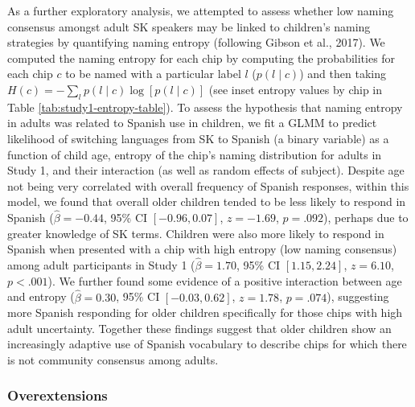 \documentclass[
  english,
  ,apa7,floatsintext]{apa6}
\begin{document}
As a further exploratory analysis, we attempted to assess whether low naming consensus amongst adult SK speakers may be linked to children's naming strategies by quantifying naming entropy (following Gibson et al., 2017). We computed the naming entropy for each chip by computing the probabilities for each chip \(c\) to be named with a particular label \(l\) (\(p(l \mid c)\)) and then taking \(H(c) = -\sum_{l}{p(l\mid c) \log[p(l \mid c)]}\) (see inset entropy values by chip in Table \ref{tab:study1-entropy-table}).
To assess the hypothesis that naming entropy in adults was related to Spanish use in children, we fit a GLMM to predict likelihood of switching languages from SK to Spanish (a binary variable) as a function of child age, entropy of the chip's naming distribution for adults in Study 1, and their interaction (as well as random effects of subject). Despite age not being very correlated with overall frequency of Spanish responses, within this model, we found that overall older children tended to be less likely to respond in Spanish (\(\hat{\beta} = -0.44\), 95\% CI \([-0.96, 0.07]\), \(z = -1.69\), \(p = .092\)), perhaps due to greater knowledge of SK terms. Children were also more likely to respond in Spanish when presented with a chip with high entropy (low naming consensus) among adult participants in Study 1 (\(\hat{\beta} = 1.70\), 95\% CI \([1.15, 2.24]\), \(z = 6.10\), \(p < .001\)). We further found some evidence of a positive interaction between age and entropy (\(\hat{\beta} = 0.30\), 95\% CI \([-0.03, 0.62]\), \(z = 1.78\), \(p = .074\)), suggesting more Spanish responding for older children specifically for those chips with high adult uncertainty. Together these findings suggest that older children show an increasingly adaptive use of Spanish vocabulary to describe chips for which there is not community consensus among adults.

\hypertarget{overextensions}{%
\subsubsection{Overextensions}\label{overextensions}}
\end{document}

